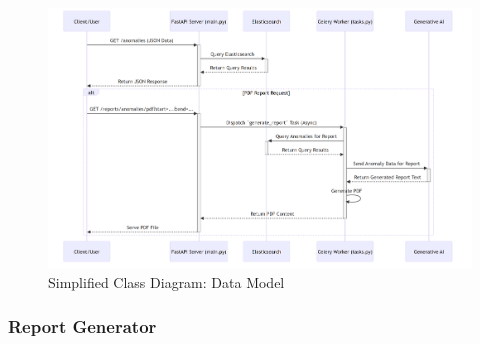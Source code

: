 \begin{figure}[H]
    \centering
    \includegraphics[width=1.2\textwidth,angle=90]{figures/api-1.png}
    \caption{Simplified Class Diagram: Data Model}
    \label{fig:class_diagram_data_model}
\end{figure}




\subsubsection{Report Generator}

